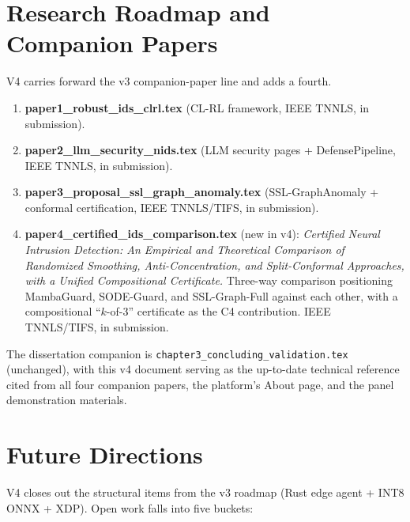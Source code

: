 \documentclass[11pt,a4paper]{article}
\begin{document}
\section{Research Roadmap and Companion Papers}
\label{sec:research_roadmap}

V4 carries forward the v3 companion-paper line and adds a fourth.

\begin{enumerate}[leftmargin=*]
  \item \textbf{paper1\_robust\_ids\_clrl.tex} (CL-RL framework, IEEE
        TNNLS, in submission).
  \item \textbf{paper2\_llm\_security\_nids.tex} (LLM security pages
        + DefensePipeline, IEEE TNNLS, in submission).
  \item \textbf{paper3\_proposal\_ssl\_graph\_anomaly.tex}
        (SSL-GraphAnomaly + conformal certification, IEEE TNNLS/TIFS,
        in submission).
  \item \textbf{paper4\_certified\_ids\_comparison.tex} (new in v4):
        \emph{Certified Neural Intrusion Detection: An Empirical and
        Theoretical Comparison of Randomized Smoothing,
        Anti-Concentration, and Split-Conformal Approaches, with a
        Unified Compositional Certificate.}  Three-way comparison
        positioning MambaGuard, SODE-Guard, and SSL-Graph-Full
        against each other, with a compositional ``$k$-of-3''
        certificate as the C4 contribution.  IEEE TNNLS/TIFS, in
        submission.
\end{enumerate}

The dissertation companion is
\texttt{chapter3\_concluding\_validation.tex} (unchanged), with this
v4 document serving as the up-to-date technical reference cited from
all four companion papers, the platform's About page, and the panel
demonstration materials.

\section{Future Directions}
\label{sec:future}

V4 closes out the structural items from the v3 roadmap (Rust edge
agent + INT8 ONNX + XDP).  Open work falls into five buckets:
\end{document}
